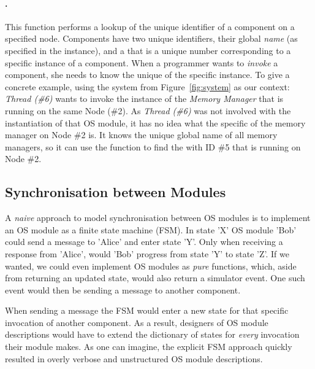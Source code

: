 \paragraph{.}
This function performs a lookup of the unique identifier of a component on a specified node.
Components have two unique identifiers, their global \emph{name} (as specified in the  instance), and a  that is a unique number corresponding to a specific instance of a component.
When a programmer wants to \emph{invoke} a component, she needs to know the unique \mbox{} of the specific instance.
To give a concrete example, using the system from Figure~\ref{fig:system} as our context: \emph{Thread (\#6)} wants to invoke the instance of the \emph{Memory Manager} that is running on the same Node (\#2).
As \emph{Thread (\#6)} was not involved with the instantiation of that OS module, it has no idea what the specific  of the memory manager on Node \#2 is.
It knows the unique global name of all memory managers, so it can use the  function to find the  with ID \#5 that is running on Node \#2.

\subsection{Synchronisation between Modules}
A \emph{naive} approach to model synchronisation between OS modules is to implement an OS module as a finite state machine (FSM).
In state 'X' OS module 'Bob' could send a message to 'Alice' and enter state 'Y'.
Only when receiving a response from 'Alice', would 'Bob' progress from state 'Y' to state 'Z'.
If we wanted, we could even implement OS modules as \emph{pure} functions, which, aside from returning an updated state, would also return a simulator event.
One such event would then be sending a message to another component.

When sending a message the FSM would enter a new state for that specific invocation of another component.
As a result, designers of OS module descriptions would have to extend the dictionary of states for \emph{every} invocation their module makes.
As one can imagine, the explicit FSM approach quickly resulted in overly verbose and unstructured OS module descriptions.

